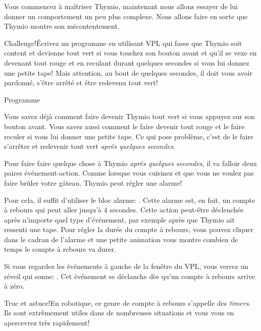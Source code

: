 
Vous commencez à maîtriser Thymio, maintenant nous allons essayer de lui donner un comportement un peu plus complexe. Nous allons faire en sorte que Thymio montre son mécontentement.

\begin{bclogo}[couleur = pink!30, arrondi = 0.1, logo = \bccrayon, ombre = true]{Challenge!}Écrivez un programme en utilisant VPL qui fasse que Thymio soit content et devienne tout vert si vous touchez son bouton avant et qu'il se vexe en devenant tout rouge et en reculant durant quelques secondes si vous lui donnez une petite tape! Mais attention, au bout de quelques secondes, il doit vous avoir pardonné, s'être arrêté et être redevenu tout vert!
\end{bclogo}

{\raggedleft \hfill Programme }

Vous savez déjà comment faire devenir Thymio tout vert si vous appuyez sur son bouton avant. Vous savez aussi comment le faire devenir tout rouge et le faire reculer si vous lui donner une petite tape. Ce qui pose problème, c'est de le faire s'arrêter et redevenir tout vert \textit{après quelques secondes}.

Pour faire faire quelque chose à Thymio \textit{après quelques secondes}, il va falloir deux paires événement-action. Comme lorsque vous cuisinez et que vous ne voulez pas faire brûler votre gâteau, Thymio peut régler une alarme! 

Pour cela, il suffit d'utiliser le bloc alarme: . Cette alarme est, en fait, un compte à rebours qui peut aller jusqu'à 4 secondes. Cette action peut-être déclenchée après n'importe quel type d'événement, par exemple après que Thymio ait ressenti une tape. Pour régler la durée du compte à rebours, vous pouvez cliquer dans le cadran de l'alarme et une petite animation vous montre combien de temps le compte à rebours va durer.

Si vous regardez les événements à gauche de la fenêtre du VPL, vous verrez un réveil qui sonne: . Cet événement se déclanche dès qu'un compte à rebours arrive à zéro.

\begin{bclogo}[couleur = blue!30, arrondi = 0.1, logo = \bcinfo, ombre = true]{Truc et astuce!}En robotique, ce genre de compte à rebours s'appelle des \textit{timers}. Ils sont extrêmement utiles dans de nombreuses situations et vous vous en apercevrez très rapidement!
\end{bclogo}

